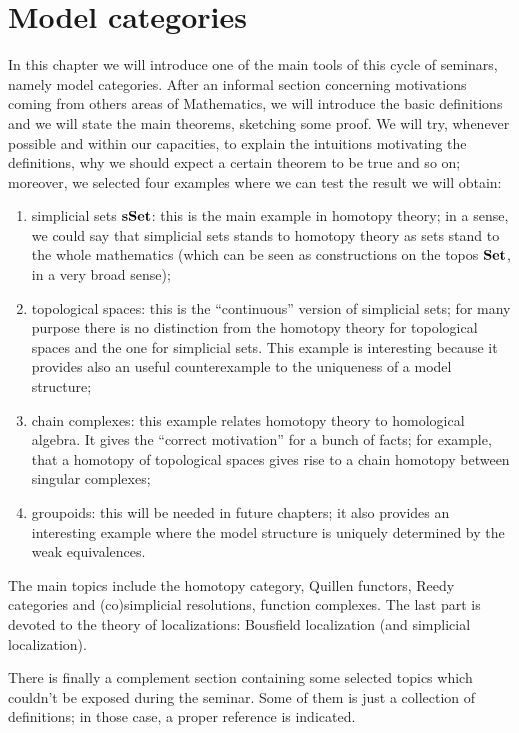 \chapter{Model categories}

\begin{refsection}

In this chapter we will introduce one of the main tools of this cycle of seminars, namely model categories. After an informal section concerning motivations coming from others areas of Mathematics, we will introduce the basic definitions and we will state the main theorems, sketching some proof. We will try, whenever possible and within our capacities, to explain the intuitions motivating the definitions, why we should expect a certain theorem to be true and so on; moreover, we selected four examples where we can test the result we will obtain:
\begin{enumerate}
\item simplicial sets $\mathbf{sSet}$: this is the main example in homotopy theory; in a sense, we could say that simplicial sets stands to homotopy theory as sets stand to the whole mathematics (which can be seen as constructions on the topos $\mathbf{Set}$, in a very broad sense);
\item topological spaces: this is the ``continuous'' version of simplicial sets; for many purpose there is no distinction from the homotopy theory for topological spaces and the one for simplicial sets. This example is interesting because it provides also an useful counterexample to the uniqueness of a model structure;
\item chain complexes: this example relates homotopy theory to homological algebra. It gives the ``correct motivation'' for a bunch of facts; for example, that a homotopy of topological spaces gives rise to a chain homotopy between singular complexes;
\item groupoids: this will be needed in future chapters; it also provides an interesting example where the model structure is uniquely determined by the weak equivalences.
\end{enumerate}
The main topics include the homotopy category, Quillen functors, Reedy categories and (co)simplicial resolutions, function complexes. The last part is devoted to the theory of localizations: Bousfield localization (and simplicial localization).

There is finally a complement section containing some selected topics which couldn't be exposed during the seminar. Some of them is just a collection of definitions; in those case, a proper reference is indicated.


\end{refsection}
